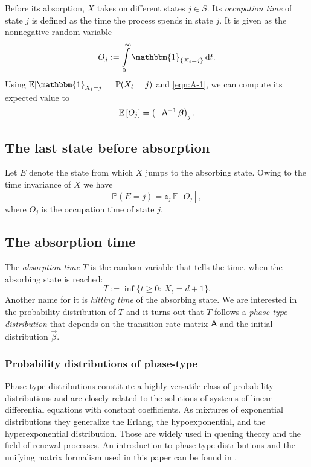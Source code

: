 \documentclass[smallextended]{svjour3}
\renewcommand{\P}{\mathbb{P}}
\newcommand{\E}{\mathbb{E}}
\newcommand{\intl}{\int\limits}
\begin{document}
Before its absorption, $X$ takes on different states $j\in S$.
Its \emph{occupation time} of state $j$ is defined as the time the process spends in state $j$.
It is given as the nonnegative random variable
\[
    O_j := \intl_0^\infty\mathbbm{1}_{\{X_t=j\}}\,\mathrm{d}t.
\]
Using $\E[\mathbbm{1}_{X_t=j}]=\P(X_t=j)$ and \eqref{eqn:A-1}, we can compute its expected value to
\begin{equation*}
    \E\left[O_j\right] = \left(-\tens{A}^{-1}\,\vec{\beta}\right)_j.
\end{equation*}

\subsection{The last state before absorption}

Let $E$ denote the state from which $X$ jumps to the absorbing state.
Owing to the time invariance of $X$ we have
\begin{equation}\label{eqn:last_state_ba}
    \P(E=j)=z_j\,\E[O_j],
\end{equation}
where $O_j$ is the occupation time of state $j$.

\subsection{The absorption time}

The \emph{absorption time} $T$ is the random variable that tells the time, when the absorbing state is reached:
\[
    T:=\inf\{t\geq0:\,X_t=d+1\}.
\]
Another name for it is \emph{hitting time} of the absorbing state.
We are interested in the probability distribution of $T$ and it turns out that $T$ follows a \emph{phase-type distribution} that depends on the transition rate matrix $\mathsf{A}$ and the initial distribution $\vec{\beta}$.

\subsubsection{Probability distributions of phase-type}

Phase-type distributions constitute a highly versatile class of probability distributions and are closely related to the solutions of systems of linear differential equations with constant coefficients.
As mixtures of exponential distributions they generalize the Erlang, the hypoexponential, and the hyperexponential distribution.
Those are widely used in queuing theory and the field of renewal processes.
An introduction to phase-type distributions and the unifying matrix formalism used in this paper can be found in \citet{Neuts1981}.
\end{document}
